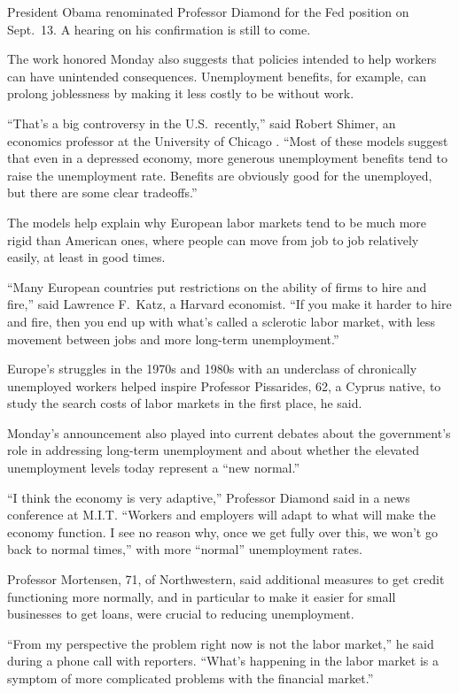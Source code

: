 ﻿\documentclass[12pt]{article}
\begin{document}
President Obama renominated Professor Diamond for the Fed position on Sept.~13. A hearing on his
confirmation is still to come.

The work honored Monday also suggests that policies intended to help workers can have unintended
consequences. Unemployment benefits, for example, can prolong joblessness by making it less costly
to be without work.

``That's a big controversy in the U.S.~recently,'' said Robert Shimer, an economics professor at the
University of Chicago . ``Most of these models suggest that even in a depressed economy, more
generous unemployment benefits tend to raise the unemployment rate. Benefits are obviously good for
the unemployed, but there are some clear tradeoffs.''

The models help explain why European labor markets tend to be much more rigid than American ones,
where people can move from job to job relatively easily, at least in good times.

``Many European countries put restrictions on the ability of firms to hire and fire,'' said Lawrence
F.~Katz, a Harvard economist. ``If you make it harder to hire and fire, then you end up with what's
called a sclerotic labor market, with less movement between jobs and more long-term unemployment.''

Europe's struggles in the 1970s and 1980s with an underclass of chronically unemployed workers
helped inspire Professor Pissarides, 62, a Cyprus native, to study the search costs of labor markets
in the first place, he said.

Monday's announcement also played into current debates about the government's role in addressing
long-term unemployment and about whether the elevated unemployment levels today represent a ``new
normal.''

``I think the economy is very adaptive,'' Professor Diamond said in a news conference at M.I.T.
``Workers and employers will adapt to what will make the economy function. I see no reason why, once
we get fully over this, we won't go back to normal times,'' with more ``normal'' unemployment rates.

Professor Mortensen, 71, of Northwestern, said additional measures to get credit functioning more
normally, and in particular to make it easier for small businesses to get loans, were crucial to
reducing unemployment.

``From my perspective the problem right now is not the labor market,'' he said during a phone call
with reporters. ``What's happening in the labor market is a symptom of more complicated problems
with the financial market.''
\end{document}
